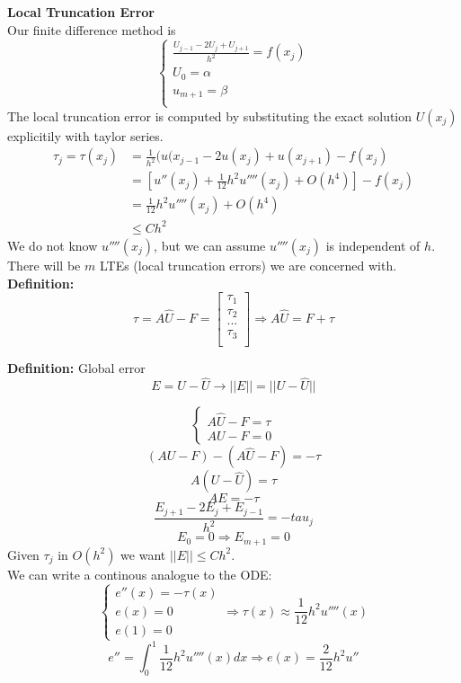 \documentclass[10pt]{article}
\begin{document}
\textbf{Local Truncation Error}\\
Our finite difference method is
\[\begin{cases}
\frac{U_{j-1} - 2U_j + U_{j+1}}{h^2} = f(x_j)\\
U_0 = \alpha\\
u_{m+1} = \beta\\
\end{cases}\]
The local truncation error is computed by substituting the exact solution $U(x_j)$ explicitily with taylor series.
\begin{align*}
    \tau_j = \tau(x_j) &= \frac{1}{h^2}(u(x_{j-1} - 2u(x_j) + u(x_{j+1}) - f(x_j)\\
                       &= [u''(x_j) + \frac{1}{12}h^2u''''(x_j) + O(h^4)] - f(x_j)\\
                       &= \frac{1}{12} h^2 u''''(x_j) + O(h^4)\\
                       &\leq Ch^2
\end{align*}
We do not know $u''''(x_j)$, but we can assume $u''''(x_j)$ is independent of $h$. There will be $m$ LTEs (local truncation errors) we are concerned with.\\
\newpage
\textbf{Definition:} 
\[\tau = A \hat{U} - F =
\begin{bmatrix}
\tau_1\\
\tau_2\\
...\\
\tau_3\\
\end{bmatrix}
\Rightarrow A\hat{U} = F + \tau\]

\textbf{Definition:} Global error
\[E = U - \hat{U} \rightarrow ||E|| = ||U - \hat{U}||\]

\[\begin{cases}
    A\hat{U} - F = \tau\\
    AU - F = 0
\end{cases}\]
\[(AU - F) - (A\hat{U} - F) = -\tau\]
\[A(U - \hat{U}) = \tau\]
\[AE = -\tau\]
\[\frac{E_{j+1} - 2E_j + E_{j-1}}{h^2} = -tau_j\]
\[E_0 = 0 \Rightarrow E_{m+1} = 0\]
Given $\tau_j$ in $O(h^2)$ we want \underline{$||E|| \leq Ch^2$}.\\
We can write a continous analogue to the ODE:
\[\begin{cases}
    e''(x) = -\tau(x)\\
    e(x) = 0\\
    e(1) = 0
\end{cases} \Rightarrow \tau(x) \approx \frac{1}{12} h^2u''''(x)\]
\[e'' = \int^1_0 \frac{1}{12}h^2 u''''(x) dx \Rightarrow e(x) = \frac{2}{12}h^2 u''\]
\end{document}
